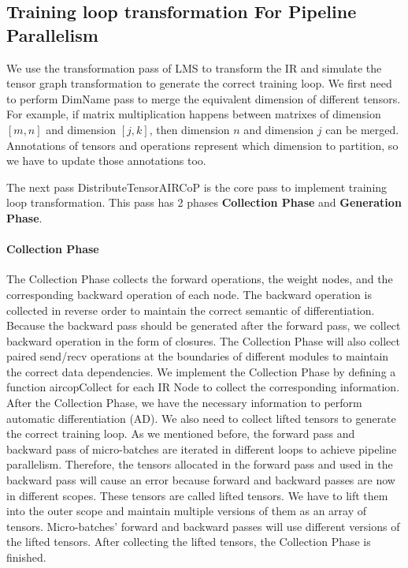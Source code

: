 \documentclass[sigplan, nonacm]{acmart}\settopmatter{printfolios=true,printccs=false,printacmref=false}
\begin{document}
\subsection{Training loop transformation For Pipeline Parallelism}
We use the transformation pass of LMS to transform the IR and simulate the tensor graph transformation to generate the correct training loop. We first need to perform DimName pass to merge the equivalent dimension of different tensors. For example, if matrix multiplication happens between matrixes of dimension $[m, n]$ and dimension $[j,k]$, then dimension $n$ and dimension $j$ can be merged.  Annotations of tensors and operations represent which dimension to partition, so we have to update those annotations too. \par
The next pass DistributeTensorAIRCoP is the core pass to implement training loop transformation. This pass has 2 phases \textbf{Collection Phase} and \textbf{Generation Phase}.\par
\paragraph{Collection Phase}
The Collection Phase collects the forward operations, the weight nodes, and the corresponding backward operation of each node. The backward operation is collected in reverse order to maintain the correct semantic of differentiation. Because the backward pass should be generated after the forward pass, we collect backward operation in the form of closures. The Collection Phase will also collect paired send/recv operations at the boundaries of different modules to maintain the correct data dependencies. We implement the Collection Phase by defining a function aircopCollect for each IR Node to collect the corresponding information. After the Collection Phase, we have the necessary information to perform automatic differentiation (AD). We also need to collect lifted tensors to generate the correct training loop. As we mentioned before, the forward pass and backward pass of micro-batches are iterated in different loops to achieve pipeline parallelism. Therefore, the tensors allocated in the forward pass and used in the backward pass will cause an error because forward and backward passes are now in different scopes. These tensors are called lifted tensors. We have to lift them into the outer scope and maintain multiple versions of them as an array of tensors. Micro-batches' forward and backward passes will use different versions of the lifted tensors. After collecting the lifted tensors, the Collection Phase is finished.\par
\end{document}
